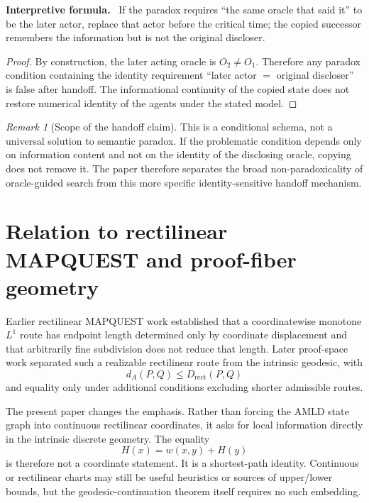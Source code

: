 \documentclass[11pt]{article}
\theoremstyle{definition}
\theoremstyle{remark}
\newtheorem{remark}[theorem]{Remark}
\newenvironment{interpretiveformula}{%
  \begin{center}\begin{minipage}{0.92\textwidth}\small
  \textbf{Interpretive formula.}\ }{\end{minipage}\end{center}}
\begin{document}
\begin{interpretiveformula}
If the paradox requires ``the same oracle that said it'' to be the later actor, replace that actor before the critical time; the copied successor remembers the information but is not the original discloser.
\end{interpretiveformula}

\begin{proof}
By construction, the later acting oracle is $O_2\neq O_1$. Therefore any paradox condition containing the identity requirement ``later actor $=$ original discloser'' is false after handoff. The informational continuity of the copied state does not restore numerical identity of the agents under the stated model.
\end{proof}

\begin{remark}[Scope of the handoff claim]
This is a conditional schema, not a universal solution to semantic paradox. If the problematic condition depends only on information content and not on the identity of the disclosing oracle, copying does not remove it. The paper therefore separates the broad non-paradoxicality of oracle-guided search from this more specific identity-sensitive handoff mechanism.
\end{remark}

\section{Relation to rectilinear MAPQUEST and proof-fiber geometry}
Earlier rectilinear MAPQUEST work established that a coordinatewise monotone $L^1$ route has endpoint length determined only by coordinate displacement and that arbitrarily fine subdivision does not reduce that length. Later proof-space work separated such a realizable rectilinear route from the intrinsic geodesic, with
\[
d_A(P,Q)\le D_{\mathrm{rect}}(P,Q)
\]
and equality only under additional conditions excluding shorter admissible routes.

The present paper changes the emphasis. Rather than forcing the AMLD state graph into continuous rectilinear coordinates, it asks for local information directly in the intrinsic discrete geometry. The equality
\[
H(x)=w(x,y)+H(y)
\]
is therefore not a coordinate statement. It is a shortest-path identity. Continuous or rectilinear charts may still be useful heuristics or sources of upper/lower bounds, but the geodesic-continuation theorem itself requires no such embedding.
\end{document}
